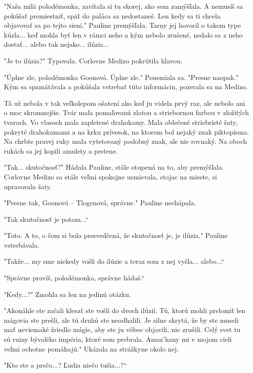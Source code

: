 \documentclass{book}
\begin{document}
"$ $Naša milá polodémonka, zavítala si tu skorej, ako som zamýšľala. A nemusíš sa pokúšať premiestniť, späť do paláca sa nedostaneš. Len kedy sa ti chcela objavovať sa po tejto sieni."$ $ Pauline premýšľala. Tarny jej hovoril o takom type kúzla... keď mohla byť len v rámci neho a kým nebolo zrušené, nedalo sa z neho dostať... alebo tak nejako... ilúzia...

"$ $Je to ilúzia?"$ $ Typovala. Corlovne Medizo pokrútila hlavou.

"$ $Úplne zle, polodémonka Goonová. Úplne zle."$ $ Pousmiala sa. "$ $Presne naopak."$ $ Kým sa spamätávala a pokúšala vstrebať túto informáciu, pozerala sa na Medizo.

Tá už nebola v tak veľkolepom ošatení ako keď ju videla prvý raz, ale nebolo ani o moc skromnejšie. Tvár mala pomaľovanú zlatou a striebornou farbou v zložitých tvaroch. Vo vlasoch mala zapletené drahokamy. Mala oblečené striebristé šaty, pokryté drahokamami a na krku prívesok, na ktorom bol nejaký znak piktopísma. Na chrbte pravej ruky mala vytetovaný podobný znak, ale nie rovnaký. Na oboch rukách sa jej kopili amulety a prstene.

"$ $Tak... skutočnosť?"$ $ Hádala Pauline, stále otupená na to, aby premýšľala. Corlovne Medizo sa stále veľmi spokojne usmievala, stojac na mieste, si upravovala šaty.

"$ $Presne tak, Goonová – Tlogenová, správne."$ $ Pauline nechápala.

"$ $Tak skutočnosť je potom...“

"$ $Toto. A to, o čom si bola presvedčená, že skutočnosť je, je ilúzia."$ $ Pauline vstrebávala.

"$ $Takže... my sme niekedy vošli do ilúzie a teraz som z nej vyšla... alebo...“

"$ $Správne pravíš, polodémonka, správne hádaš.“

"$ $Kedy...?"$ $ Zmohla sa len na jedinú otázku.

"$ $Akonáhle ste začali klesať ste vošli do dvoch ilúzií. Tú, ktorú mohli prelomiť len mágovia ste prešli, ale tú druhú ste neodhalili. Je silne skrytá, že by ste museli mať neviemaké žriedlo mágie, aby ste ju vôbec objavili, nie zrušili. Celý svet tu sú ruiny bývalého impéria, ktoré som prebrala. Amaz'hany mi v mojom cieli veľmi ochotne pomáhajú."$ $ Ukázala na strážkyne okolo nej.

"$ $Kto ste a prečo...? Ľudia niečo tušia...?“
\end{document}
